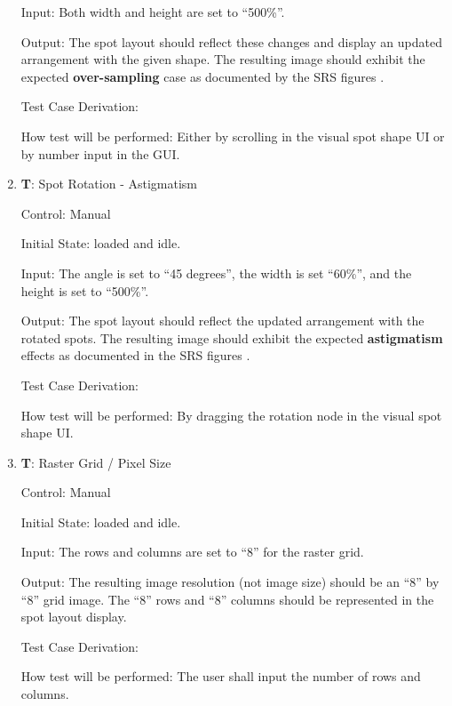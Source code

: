 \documentclass[12pt, titlepage]{article}
\newcounter{testnum} %
\begin{document}
\begin{enumerate}
    Input: Both width and height are set to ``500\%''.
              
    Output: The spot layout should reflect these changes and display an updated arrangement with the given shape.
    The resulting image should exhibit the expected \textbf{over-sampling} case as documented by the SRS figures \citep{SRS}.

    Test Case Derivation: 
              
    How test will be performed: Either by scrolling in the visual spot shape UI or by number input in the GUI.
					
  \item{\textbf{T\thetestnum \label{T_spotRotation}}: Spot Rotation - Astigmatism\\}

    Control: Manual
                
    Initial State: \progname{} loaded and idle.
              
    Input: The angle is set to ``45 degrees'', the width is set ``60\%'', and the height is set to ``500\%''.
              
    Output: The spot layout should reflect the updated arrangement with the rotated spots.
    The resulting image should exhibit the expected \textbf{astigmatism} effects as documented in the SRS figures \citep{SRS}.

    Test Case Derivation: 

    How test will be performed: By dragging the rotation node in the visual spot shape UI.
					
    \item{\textbf{T\thetestnum \label{T_rasterGrid}}: Raster Grid / Pixel Size\\}

    Control: Manual
                
    Initial State: \progname{} loaded and idle.
              
    Input: The rows and columns are set to ``8'' for the raster grid.
              
    Output: The resulting image resolution (not image size) should be an ``8'' by ``8'' grid image.
    The ``8'' rows and ``8'' columns should be represented in the spot layout display.

    Test Case Derivation: 

    How test will be performed: The user shall input the number of rows and columns.


\end{enumerate}
\end{document}
